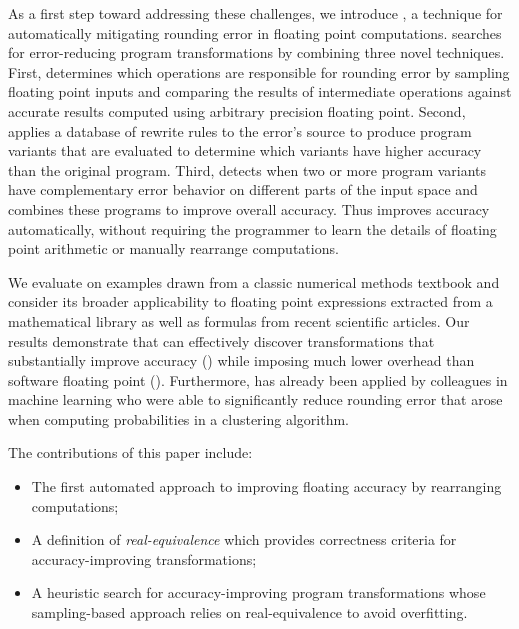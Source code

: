 \documentclass[paper.tex]{subfiles}
\begin{document}
As a first step toward addressing these challenges, we introduce
\casio, a technique for automatically mitigating rounding error in
floating point computations.  \casio searches for error-reducing
program transformations by combining three novel techniques.  First,
\casio determines which operations are responsible for rounding error
by sampling floating point inputs and comparing the results of
intermediate operations against accurate results computed using
arbitrary precision floating point.  Second, \casio applies a database
of rewrite rules to the error's source to produce program variants
that are evaluated to determine which variants have higher accuracy
than the original program. Third, \casio detects when two or more
program variants have complementary error behavior on different parts
of the input space and combines these programs to improve overall
accuracy. Thus \casio improves accuracy automatically, without
requiring the programmer to learn the details of floating point
arithmetic or manually rearrange computations.

We evaluate \casio on examples drawn from a classic numerical methods
textbook and consider its broader applicability to floating point
expressions extracted from a mathematical library as well as formulas
from recent scientific articles.  Our results demonstrate that \casio
can effectively discover transformations that substantially improve
accuracy () while imposing much lower
overhead than software floating point ().  Furthermore, \casio has already been applied by colleagues
in machine learning who were able to significantly reduce rounding
error that arose when computing probabilities in a clustering
algorithm.

\medskip

\noindent The contributions of this paper include:
\begin{itemize}
\item The first automated approach to improving floating accuracy by
  rearranging computations;
\item A definition of \textit{real-equivalence} which provides
  correctness criteria for accuracy-improving transformations;
\item A heuristic search for accuracy-improving program
  transformations whose sampling-based approach relies on
  real-equivalence to avoid overfitting.
\end{itemize}
\end{document}
